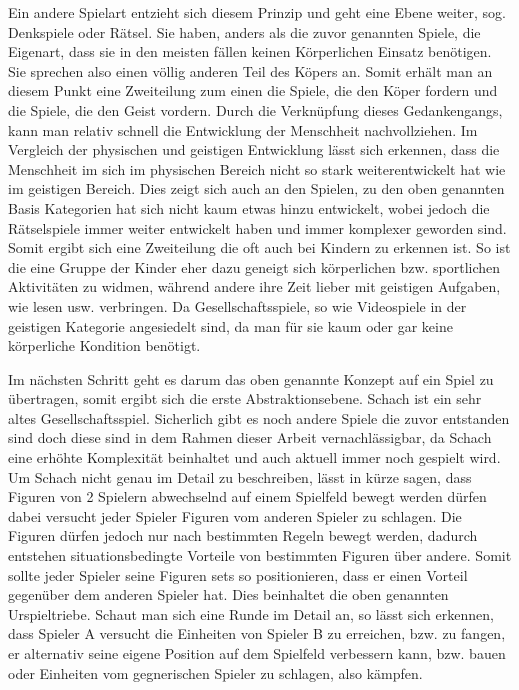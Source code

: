 Ein andere Spielart entzieht sich diesem Prinzip und geht eine Ebene weiter, sog. Denkspiele oder Rätsel. Sie haben, anders als die zuvor genannten Spiele, die Eigenart, dass sie in den meisten fällen keinen Körperlichen Einsatz benötigen. Sie sprechen also einen völlig anderen Teil des Köpers an. Somit erhält man an diesem Punkt eine Zweiteilung zum einen die Spiele, die den Köper fordern und die Spiele, die den Geist vordern. Durch die Verknüpfung dieses Gedankengangs, kann man relativ schnell die Entwicklung der Menschheit nachvollziehen. Im Vergleich der physischen und geistigen Entwicklung lässt sich erkennen, dass die Menschheit im sich im physischen Bereich nicht so stark weiterentwickelt hat wie im geistigen Bereich. Dies zeigt sich auch an den Spielen, zu den oben genannten Basis Kategorien hat sich nicht kaum etwas hinzu entwickelt, wobei jedoch die Rätselspiele immer weiter entwickelt haben und immer komplexer geworden sind. Somit ergibt sich eine Zweiteilung die oft auch bei Kindern zu erkennen ist. So ist die eine Gruppe der Kinder eher dazu geneigt sich körperlichen bzw. sportlichen Aktivitäten zu widmen, während andere ihre Zeit lieber mit geistigen Aufgaben, wie lesen usw. verbringen. Da Gesellschaftsspiele, so wie Videospiele in der geistigen Kategorie angesiedelt sind, da man für sie kaum oder gar keine körperliche Kondition benötigt.

Im nächsten Schritt geht es darum das oben genannte Konzept auf ein Spiel zu übertragen, somit ergibt sich die erste Abstraktionsebene. Schach ist ein sehr altes Gesellschaftsspiel. Sicherlich gibt es noch andere Spiele die zuvor entstanden sind doch diese sind in dem Rahmen dieser Arbeit vernachlässigbar, da Schach eine erhöhte Komplexität beinhaltet und auch aktuell immer noch gespielt wird. Um Schach nicht genau im Detail zu beschreiben, lässt in kürze sagen, dass Figuren von 2 Spielern abwechselnd auf einem Spielfeld bewegt werden dürfen dabei versucht jeder Spieler Figuren vom anderen Spieler zu schlagen. Die Figuren dürfen jedoch nur nach bestimmten Regeln bewegt werden, dadurch entstehen situationsbedingte Vorteile von bestimmten Figuren über andere. Somit sollte jeder Spieler seine Figuren sets so positionieren, dass er einen Vorteil gegenüber dem anderen Spieler hat. Dies beinhaltet die oben genannten Urspieltriebe. Schaut man sich eine Runde im Detail an, so lässt sich erkennen, dass Spieler A versucht die Einheiten von Spieler B zu erreichen, bzw. zu fangen, er alternativ seine eigene Position auf dem Spielfeld verbessern kann, bzw. bauen oder Einheiten vom gegnerischen Spieler zu schlagen, also kämpfen. 

